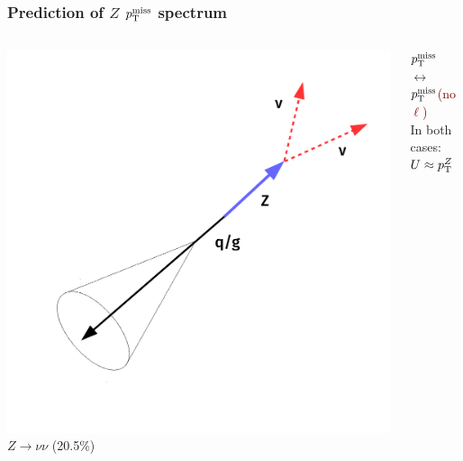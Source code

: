 \documentclass[aspectratio=169,xcolor=dvipsnames,,table,compress]{beamer}
\begin{document}
\begin{frame}[t]  \frametitle{Prediction of $Z$ $p_\text{T}^\text{miss}$ spectrum}
  \vspace{-5mm}
  \begin{itemize}
  \end{itemize}
  \begin{columns}
  \begin{column}{0.33\textwidth}
    \centering
    \includegraphics[width=\textwidth]{../figures/talk/zsr.pdf}\\ \vspace{-7mm}
    \textcolor{mygrey}{$Z\rightarrow\nu\nu$} (20.5\%) \\
  \end{column}
  \begin{column}{0.34\textwidth}
    \centering
    {\Large \textcolor{mygrey}{$p_\text{T}^\text{miss}$} $\longleftrightarrow$ \textcolor{maroon}{$ p_\text{T}^\text{miss}$(no $\ell$)}} \\
    \vspace{5mm}
    In both cases: \\
    {\Large $U \approx p_\text{T}^Z$}

\end{column}
\end{columns}
\end{frame}
\end{document}
